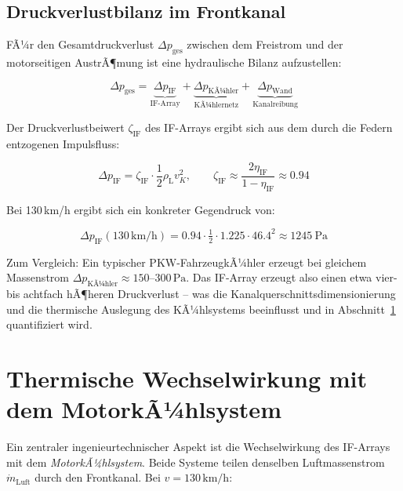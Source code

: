 ﻿\documentclass[12pt, a4paper]{report}
\theoremstyle{definition}
\theoremstyle{remark}
\newcommand{\rhoL}{\rho_{\text{L}}}
\begin{document}
\subsection{Druckverlustbilanz im Frontkanal}

FÃ¼r den Gesamtdruckverlust $\Delta p_{\text{ges}}$ zwischen dem Freistrom und
der motorseitigen AustrÃ¶mung ist eine hydraulische Bilanz aufzustellen:

\begin{equation}
  \Delta p_{\text{ges}} = \underbrace{\Delta p_{\text{IF}}}_{\text{IF-Array}}
  + \underbrace{\Delta p_{\text{KÃ¼hler}}}_{\text{KÃ¼hlernetz}}
  + \underbrace{\Delta p_{\text{Wand}}}_{\text{Kanalreibung}}
  \label{eq:druckverlust_bilanz}
\end{equation}

Der Druckverlustbeiwert $\zeta_{\text{IF}}$ des IF-Arrays ergibt sich aus dem
durch die Federn entzogenen Impulsfluss:

\begin{equation}
  \Delta p_{\text{IF}} = \zeta_{\text{IF}} \cdot \frac{1}{2}\rhoL v_K^2,
  \qquad \zeta_{\text{IF}} \approx \frac{2\eta_{\text{IF}}}{1 - \eta_{\text{IF}}}
  \approx 0.94
  \label{eq:zeta_if}
\end{equation}

Bei 130\,km/h ergibt sich ein konkreter Gegendruck von:

\begin{equation}
  \Delta p_{\text{IF}}(130\,\text{km/h})
  = 0.94 \cdot \tfrac{1}{2} \cdot 1.225 \cdot 46.4^2
  \approx \SI{1245}{\pascal}
  \label{eq:dp_if_130}
\end{equation}

Zum Vergleich: Ein typischer PKW-FahrzeugkÃ¼hler erzeugt bei gleichem Massenstrom
$\Delta p_{\text{KÃ¼hler}} \approx 150$--$300\,\text{Pa}$. Das IF-Array erzeugt
also einen etwa vier- bis achtfach hÃ¶heren Druckverlust -- was die
Kanalquerschnittsdimensionierung und die thermische Auslegung des KÃ¼hlsystems
beeinflusst und in Abschnitt~\ref{sec:kfz_thermal} quantifiziert wird.

\section{Thermische Wechselwirkung mit dem MotorkÃ¼hlsystem}
\label{sec:kfz_thermal}

Ein zentraler ingenieurtechnischer Aspekt ist die Wechselwirkung des
IF-Arrays mit dem \emph{MotorkÃ¼hlsystem}. Beide Systeme teilen denselben
Luftmassenstrom $\dot{m}_{\text{Luft}}$ durch den Frontkanal. Bei
$v = 130\,\text{km/h}$:
\end{document}
